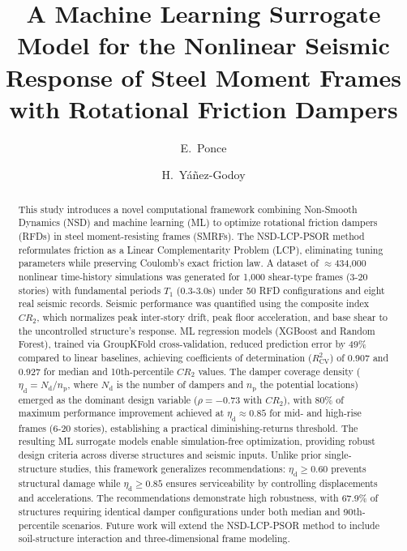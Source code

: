 \documentclass[preprint,12pt,authoryear]{elsarticle}
\newcommand{\Rsq}{R^{2}_{\mathrm{CV}}}
\newcommand{\nd}{N_{\mathrm{d}}}
\newcommand{\np}{n_{\mathrm{p}}}
\newcommand{\etad}{\eta_{\mathrm{d}}}
\begin{document}
\begin{frontmatter}

\title{A Machine Learning Surrogate Model for the Nonlinear Seismic Response
       of Steel Moment Frames with Rotational Friction Dampers}

\author[uaq]{E.~Ponce}
\author[i2m]{H.~Yáñez-Godoy}

\address[uaq]{Universidad Autónoma de Querétaro, Facultad de Ingeniería,
              Cerro de las Campanas s/n, Querétaro, Mexico}
\address[i2m]{Univ. Bordeaux, Arts et Metiers Institute of Technology,
              CNRS,
              Bordeaux INP, I2M, UMR 5295, F-33400 Talence, France}

\begin{abstract}
	This study introduces a novel computational framework combining Non-Smooth Dynamics (NSD) and machine learning (ML) to optimize rotational friction dampers (RFDs) in steel moment-resisting frames (SMRFs). The NSD-LCP-PSOR method reformulates friction as a Linear Complementarity Problem (LCP), eliminating tuning parameters while preserving Coulomb's exact friction law. A dataset of $\approx$434,000 nonlinear time-history simulations was generated for 1,000 shear-type frames (3-20 stories) with fundamental periods $T_1$ (0.3-3.0s) under 50 RFD configurations and eight real seismic records. Seismic performance was quantified using the composite index $CR_2$, which normalizes peak inter-story drift, peak floor acceleration, and base shear to the uncontrolled structure's response. ML regression models (XGBoost and Random Forest), trained via GroupKFold cross-validation, reduced prediction error by 49\% compared to linear baselines, achieving coefficients of determination ($\Rsq$) of 0.907 and 0.927 for median and 10th-percentile $CR_2$ values. The damper coverage density ($\etad=\nd/\np$, where $\nd$ is the number of dampers and $\np$ the potential locations) emerged as the dominant design variable ($\rho=-0.73$ with $CR_2$), with 80\% of maximum performance improvement achieved at $\etad\approx0.85$ for mid- and high-rise frames (6-20 stories), establishing a practical diminishing-returns threshold. The resulting ML surrogate models enable simulation-free optimization, providing robust design criteria across diverse structures and seismic inputs. Unlike prior single-structure studies, this framework generalizes recommendations: $\etad\geq0.60$ prevents structural damage while $\etad\geq0.85$ ensures serviceability by controlling displacements and accelerations. The recommendations demonstrate high robustness, with 67.9\% of structures requiring identical damper configurations under both median and 90th-percentile scenarios. Future work will extend the NSD-LCP-PSOR method to include soil-structure interaction and three-dimensional frame modeling.
\end{abstract}


\end{frontmatter}
\end{document}
